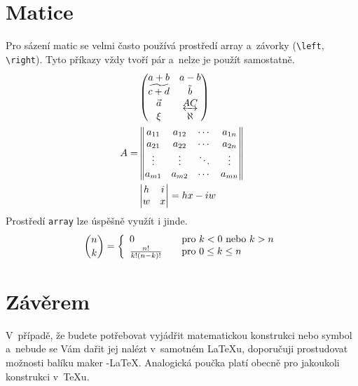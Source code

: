 \documentclass[a4paper, 11pt, twocolumn]{article}[18.03.2012]
\begin{document}
\section{Matice}
Pro sázení matic se velmi často používá prostředí array a~závorky (\verb|\left|,
\verb|\right|). Tyto příkazy vždy tvoří pár a~nelze je použít samostatně.
\begin{align*}
& \begin{pmatrix}
a+b & a-b\\
\widetilde{c+d} & \tilde{b}\\
\vec{a} & \underleftrightarrow{AC}\\
\xi & \aleph
\end{pmatrix}\\
A=
& \begin{Vmatrix}
a_{11} & a_{12} & \cdots & a_{1n}\\
a_{21} & a_{22} & \cdots & a_{2n}\\
\vdots & \vdots & \ddots & \vdots \\
a_{m1} & a_{m2} & \cdots & a_{mn}
\end{Vmatrix}\\
& \begin{vmatrix}
h & i \\
w & x
\end{vmatrix}
= hx-iw
\end{align*}
Prostředí \verb|array| lze úspěšně využít i jinde.
\[
\binom{n}{k} = \left\{
\begin{array}{l l}
0 & \quad \text{pro $k<0$ nebo $k>n$}\\
\frac{n!}{k!(n-k)!} & \quad \text{pro $0\leq k\leq n$}
\end{array}
\right.
\]
\section{Závěrem}
V~případě, že budete potřebovat vyjádřit matema\-tickou konstrukci nebo symbol
a~nebude se Vám dařit jej nalézt v~samotném \LaTeX u, doporučuji prostudovat
možnosti balíku maker \AmS-\LaTeX. Analogická poučka platí obecně pro jakoukoli
konstrukci v~\TeX u.
\end{document}
